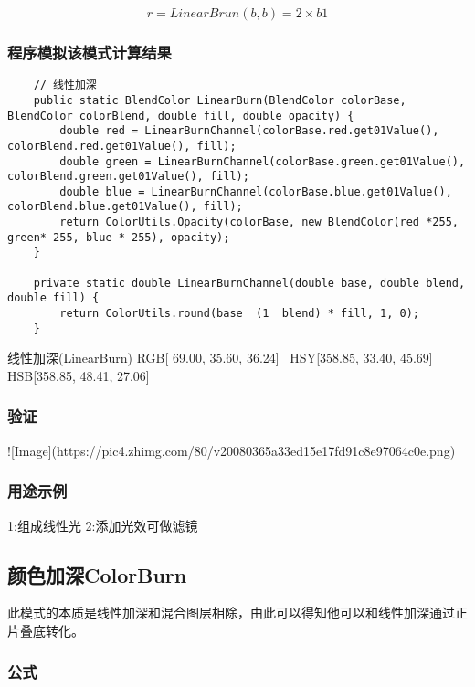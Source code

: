 $$ r=LinearBrun(b,b)=2\times b1$$

\subsubsection{ 程序模拟该模式计算结果}

\begin{lstlisting}
	// 线性加深
	public static BlendColor LinearBurn(BlendColor colorBase, BlendColor colorBlend, double fill, double opacity) {
		double red = LinearBurnChannel(colorBase.red.get01Value(), colorBlend.red.get01Value(), fill);
		double green = LinearBurnChannel(colorBase.green.get01Value(), colorBlend.green.get01Value(), fill);
		double blue = LinearBurnChannel(colorBase.blue.get01Value(), colorBlend.blue.get01Value(), fill);
		return ColorUtils.Opacity(colorBase, new BlendColor(red *255, green* 255, blue * 255), opacity);
	}
	
	private static double LinearBurnChannel(double base, double blend, double fill) {
		return ColorUtils.round(base  (1  blend) * fill, 1, 0);
	}
\end{lstlisting}




线性加深(LinearBurn)    RGB[ 69.00,  35.60,  36.24]~ HSY[358.85,  33.40,  45.69]~ HSB[358.85,  48.41,  27.06]



\subsubsection{ 验证}

![Image](https://pic4.zhimg.com/80/v20080365a33ed15e17fd91c8e97064c0e.png)

\subsubsection{ 用途示例}

1:组成线性光
2:添加光效可做滤镜

\subsection{ 颜色加深ColorBurn}

此模式的本质是线性加深和混合图层相除，由此可以得知他可以和线性加深通过正片叠底转化。

\subsubsection{ 公式}

